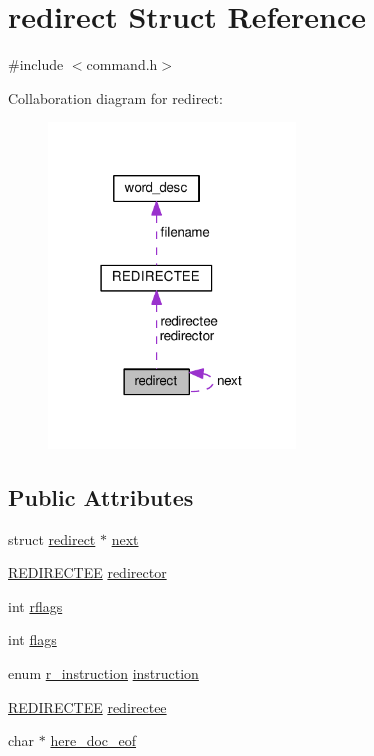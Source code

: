 \hypertarget{structredirect}{}\section{redirect Struct Reference}
\label{structredirect}


{\ttfamily \#include $<$command.\+h$>$}



Collaboration diagram for redirect\+:
\nopagebreak
\begin{figure}[H]
\begin{center}
\leavevmode
\includegraphics[width=186pt]{structredirect__coll__graph}
\end{center}
\end{figure}
\subsection*{Public Attributes}
\begin{DoxyCompactItemize}
\item 
struct \hyperlink{structredirect}{redirect} $\ast$ \hyperlink{structredirect_ae7bbd7429c76ca31edcdc88e43fd2408}{next}
\item 
\hyperlink{unionREDIRECTEE}{R\+E\+D\+I\+R\+E\+C\+T\+EE} \hyperlink{structredirect_a49cf28da45dc5c4dc890b71904f484fb}{redirector}
\item 
int \hyperlink{structredirect_a0dd66f3dc5607959984565679aca5474}{rflags}
\item 
int \hyperlink{structredirect_a9328e6f00bf0e9d9d08ecacba6374df8}{flags}
\item 
enum \hyperlink{command_8h_a30995e3628b99a0514ed9fdd9843e55d}{r\+\_\+instruction} \hyperlink{structredirect_a81e943ca1372e74ad5ab23a22f9e8beb}{instruction}
\item 
\hyperlink{unionREDIRECTEE}{R\+E\+D\+I\+R\+E\+C\+T\+EE} \hyperlink{structredirect_a484dd470583ad862e00d2d738a9f7e93}{redirectee}
\item 
char $\ast$ \hyperlink{structredirect_a3185120aafa79b4c48824283a3021e63}{here\+\_\+doc\+\_\+eof}
\end{DoxyCompactItemize}


